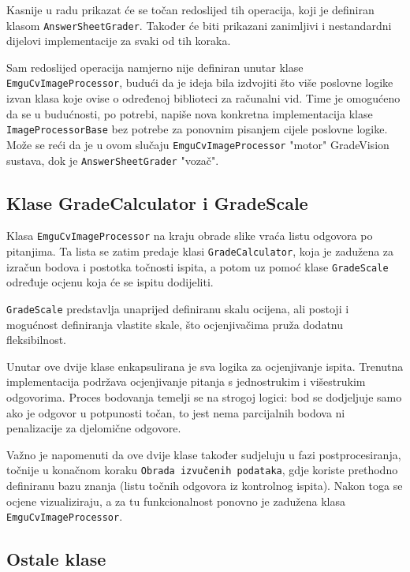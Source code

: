 \documentclass{foi}
\begin{document}
Kasnije u radu prikazat će se točan redoslijed tih operacija, koji je definiran klasom \texttt{AnswerSheetGrader}. Također će biti prikazani zanimljivi i nestandardni dijelovi implementacije za svaki od tih koraka.

Sam redoslijed operacija namjerno nije definiran unutar klase \texttt{EmguCvImageProcessor}, budući da je ideja bila izdvojiti što više poslovne logike izvan klasa koje ovise o određenoj biblioteci za računalni vid. Time je omogućeno da se u budućnosti, po potrebi, napiše nova konkretna implementacija klase \texttt{ImageProcessorBase} bez potrebe za ponovnim pisanjem cijele poslovne logike. Može se reći da je u ovom slučaju \texttt{EmguCvImageProcessor} "motor" GradeVision sustava, dok je \texttt{AnswerSheetGrader} "vozač".

\subsection{Klase GradeCalculator i GradeScale}

Klasa \texttt{EmguCvImageProcessor} na kraju obrade slike vraća listu odgovora po pitanjima. Ta lista se zatim predaje klasi \texttt{GradeCalculator}, koja je zadužena za izračun bodova i postotka točnosti ispita, a potom uz pomoć klase \texttt{GradeScale} određuje ocjenu koja će se ispitu dodijeliti.

\texttt{GradeScale} predstavlja unaprijed definiranu skalu ocijena, ali postoji i mogućnost definiranja vlastite skale, što ocjenjivačima pruža dodatnu fleksibilnost.

Unutar ove dvije klase enkapsulirana je sva logika za ocjenjivanje ispita. Trenutna implementacija podržava ocjenjivanje pitanja s jednostrukim i višestrukim odgovorima. Proces bodovanja temelji se na strogoj logici: bod se dodjeljuje samo ako je odgovor u potpunosti točan, to jest nema parcijalnih bodova ni penalizacije za djelomične odgovore.

Važno je napomenuti da ove dvije klase također sudjeluju u fazi postprocesiranja, točnije u konačnom koraku \texttt{Obrada izvučenih podataka}, gdje koriste prethodno definiranu bazu znanja (listu točnih odgovora iz kontrolnog ispita). Nakon toga se ocjene vizualiziraju, a za tu funkcionalnost ponovno je zadužena klasa \texttt{EmguCvImageProcessor}.

\subsection{Ostale klase}
\end{document}
